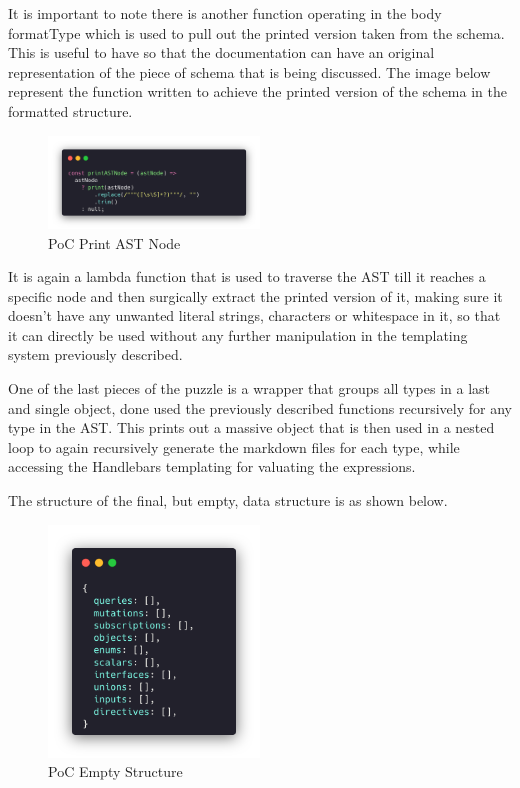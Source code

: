 It is important to note there is another function operating in the body formatType
which is used to pull out the printed version taken from the schema. This is
useful to have so that the documentation can have an original representation of
the piece of schema that is being discussed. The image below represent the function
written to achieve the printed version of the schema in the formatted structure.

\begin{figure}[H]
  \centering
  \includegraphics[width=0.5\textwidth]{figures/code/poc-print-ast.png}
  \caption{PoC Print AST Node}
  \label{f:ch5-poc-print-ast-node}
\end{figure}

It is again a lambda function that is used to traverse the AST till it reaches a
specific node and then surgically extract the printed version of it, making sure
it doesn't have any unwanted literal strings, characters or whitespace in it, so
that it can directly be used without any further manipulation in the templating
system previously described.

One of the last pieces of the puzzle is a wrapper that groups all types in a
last and single object, done used the previously described functions recursively
for any type in the AST. This prints out a massive object that is then used in a
nested loop to again recursively generate the markdown files for each type, while
accessing the Handlebars templating for valuating the expressions.

The structure of the final, but empty, data structure is as shown below.


\begin{figure}[H]
  \centering
  \includegraphics[width=0.5\textwidth]{figures/code/poc-empty-structure.png}
  \caption{PoC Empty Structure}
  \label{f:ch5-poc-empty-structure}
\end{figure}

